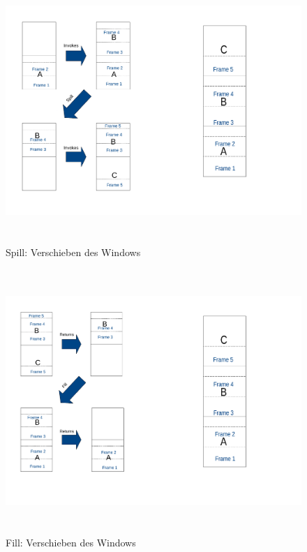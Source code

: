 \begin{figure}[H]
	\centering
	\includegraphics[height = 10cm]{PS_RS_graphics/spill.pdf}
	\caption{Spill: Verschieben des Windows }
\end{figure}

\begin{figure}[H]
	\centering
	\includegraphics[height = 10cm]{PS_RS_graphics/fill.pdf}
	\caption{Fill: Verschieben des Windows}
\end{figure}



